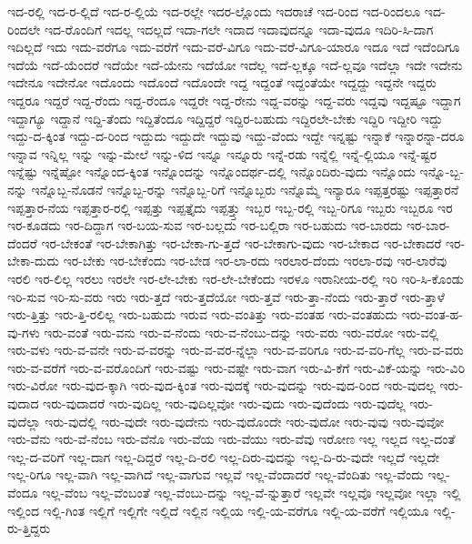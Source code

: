 {ಇದ-ರಲ್ಲಿ
ಇದ-ರ-ಲ್ಲಿದೆ
ಇದ-ರ-ಲ್ಲಿಯೆ
ಇದ-ರಲ್ಲೇ
ಇದರ-ಲ್ಲೊಂದು
ಇದರಾಚೆ
ಇದ-ರಿಂದ
ಇದ-ರಿಂದಲೂ
ಇದ-ರಿಂದಲೇ
ಇದ-ರೊಂದಿಗೆ
ಇದಲ್ಲ
ಇದಲ್ಲದೆ
ಇದಾ-ಗಲೇ
ಇದಾದ
ಇದಾವುದನ್ನೂ
ಇದಾ-ವುದೂ
ಇದಿರಿ-ಸಿ-ದಾಗ
ಇದಿಲ್ಲದೆ
ಇದು
ಇದು-ವರೆಗೂ
ಇದು-ವರೆಗೆ
ಇದು-ವರೆ-ವಿಗೂ
ಇದು-ವರೆ-ವಿಗೂ-ಯಾರೂ
ಇದೂ
ಇದೆ
ಇದೆಂದಿಗೂ
ಇದೆಯೆ
ಇದೆ-ಯೆಂದರೆ
ಇದೆಯೇ
ಇದೆ-ಯೇನು
ಇದೆಯೋ
ಇದೆಲ್ಲ
ಇದೆ-ಲ್ಲಕ್ಕೂ
ಇದೆ-ಲ್ಲವೂ
ಇದೆಲ್ಲಾ
ಇದೇ
ಇದೇನು
ಇದೇನೂ
ಇದೇನೋ
ಇದೊಂದು
ಇದೊಂದೆ
ಇದೊಂದೇ
ಇದ್ದ
ಇದ್ದಂತೆ
ಇದ್ದಂತೆಯೇ
ಇದ್ದದ್ದು
ಇದ್ದನೇ
ಇದ್ದರು
ಇದ್ದರೂ
ಇದ್ದರೆ
ಇದ್ದ-ರೆಂದು
ಇದ್ದ-ರೆಂದೂ
ಇದ್ದರೇ
ಇದ್ದ-ರೇನು
ಇದ್ದ-ವರನ್ನು
ಇದ್ದ-ವರು
ಇದ್ದವು
ಇದ್ದಷ್ಟೂ
ಇದ್ದಾಗ
ಇದ್ದಾಗ್ಯೂ
ಇದ್ದಾನೆ
ಇದ್ದಿ-ತೆಂದು
ಇದ್ದಿತೆಂದೂ
ಇದ್ದಿದ್ದರೆ
ಇದ್ದಿರ-ಬಹುದು
ಇದ್ದಿರಲೇ-ಬೇಕು
ಇದ್ದಿರಿ
ಇದ್ದೀರಿ
ಇದ್ದು
ಇದ್ದು-ದ-ಕ್ಕಿಂತ
ಇದ್ದು-ದ-ರಿಂದ
ಇದ್ದುದು
ಇದ್ದುದೇ
ಇದ್ದುವು
ಇದ್ದು-ವೆಂದು
ಇದ್ದೇ
ಇನ್ನಷ್ಟು
ಇನ್ನಾಕೆ
ಇನ್ನಾರನ್ನಾ-ದರೂ
ಇನ್ನಾವ
ಇನ್ನಿಲ್ಲ
ಇನ್ನು
ಇನ್ನು-ಮೇಲೆ
ಇನ್ನು-ಳಿದ
ಇನ್ನೂ
ಇನ್ನೂರು
ಇನ್ನೆ-ರಡು
ಇನ್ನೆಲ್ಲಿ
ಇನ್ನೆ-ಲ್ಲಿಯೂ
ಇನ್ನೆ-ಷ್ಟರ
ಇನ್ನೆಷ್ಟು
ಇನ್ನೆಷ್ಟೋ
ಇನ್ನೊಂದ-ಕ್ಕಿಂತ
ಇನ್ನೊಂದನ್ನು
ಇನ್ನೊಂದರ್ಥ-ದಲ್ಲಿ
ಇನ್ನೊಂದಿರು-ವುದು
ಇನ್ನೊಂದು
ಇನ್ನೊ-ಬ್ಬ-ನನ್ನು
ಇನ್ನೊಬ್ಬ-ನೊಡನೆ
ಇನ್ನೊಬ್ಬ-ರನ್ನು
ಇನ್ನೊಬ್ಬ-ರಿಗೆ
ಇನ್ನೊಬ್ಬರು
ಇನ್ನೊಮ್ಮೆ
ಇನ್ಯಾರೂ
ಇಪ್ಪತ್ತರಷ್ಟು
ಇಪ್ಪತ್ತಾರನೆ
ಇಪ್ಪತ್ತಾರ-ನೆಯ
ಇಪ್ಪತ್ತಾರ-ರಲ್ಲಿ
ಇಪ್ಪತ್ತು
ಇಪ್ಪತ್ತೈದು
ಇಪ್ಪತ್ತ್ತು
ಇಬ್ಬರ
ಇಬ್ಬ-ರಲ್ಲಿ
ಇಬ್ಬ-ರಿಗೂ
ಇಬ್ಬರು
ಇಬ್ಬರೂ
ಇರ
ಇರ-ಕೂಡದು
ಇರ-ದಿದ್ದಾಗ
ಇರ-ಬಯ-ಸುವ
ಇರ-ಬಲ್ಲದು
ಇರ-ಬಲ್ಲಿರಾ
ಇರ-ಬಹುದು
ಇರ-ಬಾರದು
ಇರ-ಬಾರ-ದೆಂದರೆ
ಇರ-ಬೇಕಂತೆ
ಇರ-ಬೇಕಾಗಿತ್ತು
ಇರ-ಬೇಕಾ-ಗು-ತ್ತದೆ
ಇರ-ಬೇಕಾಗು-ವುದು
ಇರ-ಬೇಕಾದ
ಇರ-ಬೇಕಾದರೆ
ಇರ-ಬೇಕಾ-ದುದು
ಇರ-ಬೇಕು
ಇರ-ಬೇಕೆಂದು
ಇರ-ಬೇಡ
ಇರ-ಲಾ-ರದು
ಇರಲಾರ-ದೆಂದು
ಇರಲಾ-ರವು
ಇರ-ಲಾರೆವು
ಇರಲಿ
ಇರ-ಲಿಲ್ಲ
ಇರಲು
ಇರಲೇ
ಇರ-ಲೇ-ಬೇಕು
ಇರ-ಲೇ-ಬೇಕೆಂದು
ಇರಳೂ
ಇರಾನೀಯ-ರಲ್ಲಿ
ಇರಿ
ಇರಿ-ಸಿ-ಕೊಂಡು
ಇರಿ-ಸುವ
ಇರಿ-ಸು-ವರು
ಇರು
ಇರು-ತ್ತದೆ
ಇರು-ತ್ತದೆಯೋ
ಇರು-ತ್ತವೆ
ಇರು-ತ್ತಾ-ನೆಂದು
ಇರು-ತ್ತಾರೆ
ಇರು-ತ್ತಾಳೆ
ಇರು-ತ್ತಿತ್ತು
ಇರು-ತ್ತಿ-ರಲಿಲ್ಲ
ಇರು-ಬಹುದು
ಇರುವ
ಇರು-ವಂತಿತ್ತು
ಇರು-ವಂತಹ
ಇರು-ವಂತಹುದು
ಇರು-ವಂತ-ಹ-ವು-ಗಳು
ಇರು-ವಂತೆ
ಇರು-ವನು
ಇರು-ವ-ನೆಂದು
ಇರು-ವ-ನೆಂಬು-ದನ್ನು
ಇರು-ವರು
ಇರು-ವರೋ
ಇರು-ವಲ್ಲಿ
ಇರು-ವಳು
ಇರು-ವ-ವನೇ
ಇರು-ವ-ವರನ್ನು
ಇರು-ವ-ವರ-ನ್ನೆಲ್ಲಾ
ಇರು-ವ-ವರಿಗೂ
ಇರು-ವ-ವರಿ-ಗೆಲ್ಲ
ಇರು-ವ-ವರು
ಇರು-ವ-ವರೆಗೆ
ಇರು-ವ-ವರೊಂದಿಗೆ
ಇರು-ವಷ್ಟು
ಇರು-ವಷ್ಟೇ
ಇರು-ವಾಗ
ಇರು-ವಿ-ಕೆಗೆ
ಇರು-ವಿಕೆ-ಯನ್ನು
ಇರು-ವಿರಿ
ಇರು-ವಿರೋ
ಇರು-ವುದ-ಕ್ಕಾಗಿ
ಇರು-ವುದ-ಕ್ಕಿಂತ
ಇರು-ವುದಕ್ಕೆ
ಇರು-ವುದನ್ನು
ಇರು-ವುದ-ರಿಂದ
ಇರು-ವುದಲ್ಲ
ಇರು-ವುದಾದ
ಇರು-ವುದಾದರೆ
ಇರು-ವುದಿಲ್ಲ
ಇರು-ವುದಿಲ್ಲವೋ
ಇರು-ವುದು
ಇರು-ವುದೆಂದು
ಇರು-ವುದೆಲ್ಲ
ಇರು-ವುದೆಲ್ಲಾ
ಇರು-ವುದೆಲ್ಲಿ
ಇರು-ವುದೇ
ಇರು-ವುದೇನು
ಇರು-ವುದೊಂದೇ
ಇರು-ವುದೋ
ಇರು-ವುವು
ಇರು-ವುವೋ
ಇರು-ವೆನು
ಇರು-ವೆ-ನೆಂಬ
ಇರು-ವೆನೊ
ಇರು-ವೆಯ
ಇರು-ವೆಯು
ಇರು-ವೆವು
ಇರೋಣ
ಇಲ್ಲ
ಇಲ್ಲದ
ಇಲ್ಲ-ದಂತೆ
ಇಲ್ಲ-ದ-ವರಿಗೆ
ಇಲ್ಲ-ದಾಗ
ಇಲ್ಲ-ದಿದ್ದರೆ
ಇಲ್ಲ-ದಿ-ರಲಿ
ಇಲ್ಲ-ದಿರು-ವುದನ್ನು
ಇಲ್ಲ-ದಿ-ರು-ವುದೇ
ಇಲ್ಲದೆ
ಇಲ್ಲದೇ
ಇಲ್ಲ-ರಿಗೂ
ಇಲ್ಲ-ವಾಗಿ
ಇಲ್ಲ-ವಾಗಿದೆ
ಇಲ್ಲ-ವಾಗುವ
ಇಲ್ಲವೆ
ಇಲ್ಲ-ವೆಂದಾದರೆ
ಇಲ್ಲ-ವೆಂದಿತು
ಇಲ್ಲ-ವೆಂದು
ಇಲ್ಲ-ವೆಂದೂ
ಇಲ್ಲ-ವೆಂಬ
ಇಲ್ಲ-ವೆಂಬಂತೆ
ಇಲ್ಲ-ವೆಂಬು-ದನ್ನು
ಇಲ್ಲ-ವೆ-ನ್ನುತ್ತಾರೆ
ಇಲ್ಲವೇ
ಇಲ್ಲವೊ
ಇಲ್ಲವೋ
ಇಲ್ಲಾ
ಇಲ್ಲಿ
ಇಲ್ಲಿಂದ
ಇಲ್ಲಿ-ಗಿಂತ
ಇಲ್ಲಿಗೆ
ಇಲ್ಲಿಗೇ
ಇಲ್ಲಿದೆ
ಇಲ್ಲಿನ
ಇಲ್ಲಿಯ
ಇಲ್ಲಿ-ಯ-ವರೆಗೂ
ಇಲ್ಲಿ-ಯ-ವರೆಗೆ
ಇಲ್ಲಿಯೂ
ಇಲ್ಲಿ-ರು-ತ್ತಿದ್ದರು
}
